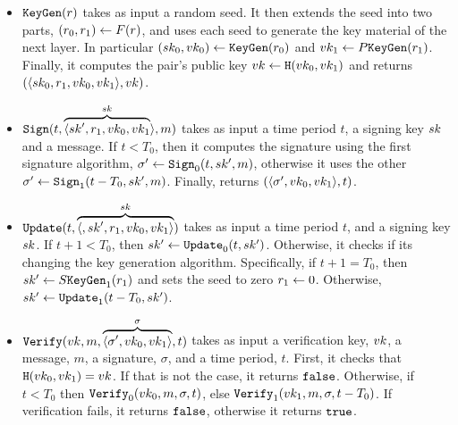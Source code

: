 \begin{itemize}
\item $\texttt{KeyGen}(r)$ takes as input a random seed. It then extends the seed into two parts, 
$(r_0, r_1)\gets F(r)$, and uses each seed to generate the key material of the next layer. In particular $(sk_0, vk_0)\gets\texttt{KeyGen}(r_0)$ and $vk_1\gets P\texttt{KeyGen}(r_1)$. Finally, it computes the pair's public key $vk\gets\texttt{H}(vk_0, vk_1)$ and returns $(\langle sk_0, r_1, vk_0, vk_1\rangle, vk)$.
\item $\texttt{Sign}(t, \overbrace{\langle sk', r_1, vk_0, vk_1}^{sk}\rangle, m)$
takes as input a time period $t$, a signing key $sk$ and a message. If $t<T_0$, then it computes the signature using the first signature algorithm, $\sigma'\gets\texttt{Sign}_0(t, sk', m)$, otherwise it uses the other $\sigma'\gets\texttt{Sign}_1(t - T_0, sk', m)$. Finally, returns $(\langle\sigma', vk _0, vk_1\rangle, t)$. 
\item $\texttt{Update}(t, \overbrace{\langle, sk', r_1, vk_0, vk_1\rangle}^{sk})$ takes as input a time period $t$, and a signing key $sk$. If $t+1<T_0$, then $sk'\gets\texttt{Update}_0(t, sk')$. Otherwise, it checks if its changing the key 
generation algorithm. Specifically, if $t+1=T_0$, then $sk'\gets S\texttt{KeyGen}_1(r_1)$ and sets the seed to zero $r_1\gets 0$. Otherwise, $sk'\gets\texttt{Update}_1(t-T_0, sk')$. 
\item $\texttt{Verify}(vk, m, \overbrace{\langle\sigma', vk_0, vk_1\rangle}^{\sigma},  t)$ takes as input
a verification key, $vk$, a message, $m$, a signature, $\sigma$, and a time period, $t$. First, it 
checks that $\texttt{H}(vk_0, vk_1) = vk$. If that is not the case, it returns $\texttt{false}$. Otherwise, if $t<T_0$ then $\texttt{Verify}_0(vk_0, m, \sigma, t)$, else $\texttt{Verify}_1(vk_1, m, \sigma, t-T_0)$. If verification fails, it returns $\texttt{false}$, otherwise it returns $\texttt{true}$. 
\end{itemize}

